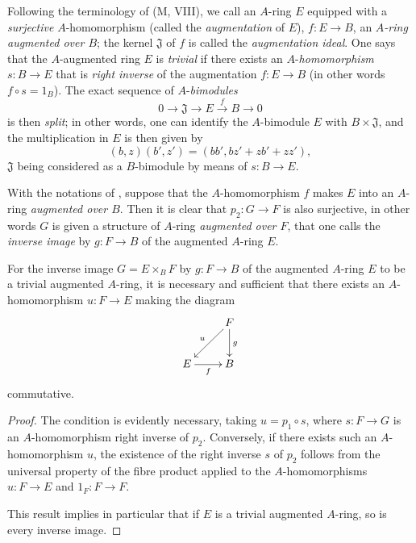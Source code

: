 \begin{env}[18.1.4]
\label{0.18.1.4}
Following the terminology of (M, VIII), we call an $A$-ring $E$ equipped with a \emph{surjective} $A$-homomorphism (called the \emph{augmentation} of $E$), $f:E\to B$, an \emph{$A$-ring augmented over $B$}; the kernel $\mathfrak{J}$ of $f$ is called the \emph{augmentation ideal}.
One says that the $A$-augmented ring $E$ is \emph{trivial} if there exists an $A$-\emph{homomorphism} $s:B\to E$ that is \emph{right inverse} of the augmentation $f:E\to B$ (in other words $f\circ s=1_B$).
The exact sequence of $A$-\emph{bimodules}
\[
  0\to\mathfrak{J}\to E\xrightarrow{f} B\to 0
\]
is then \emph{split}; in other words, one can identify the $A$-bimodule $E$ with $B\times\mathfrak{J}$, and the multiplication in $E$ is then given by
\[
  (b,z)(b',z')=(bb',bz'+zb'+zz'),
\]
$\mathfrak{J}$ being considered as a $B$-bimodule by means of $s:B\to E$.
\end{env}

\begin{env}[18.1.5]
\label{0.18.1.5}
With the notations of , suppose that the $A$-homomorphism $f$ makes $E$ into an $A$-ring \emph{augmented over $B$}.
Then it is clear that $p_2:G\to F$ is also surjective, in other words $G$ is given a structure of $A$-ring \emph{augmented over $F$}, that one calls the \emph{inverse image} by $g:F\to B$ of the augmented $A$-ring $E$.
\end{env}

\begin{proposition}[18.1.6]
\label{0.18.1.6}
For the inverse image $G=E\times_B F$ by $g:F\to B$ of the augmented $A$-ring $E$ to be a trivial augmented $A$-ring, it is necessary and sufficient that there exists an $A$-homomorphism $u:F\to E$ making the diagram
  \[
  \xymatrix{
    & F\ar[ld]_u\ar[d]^g\\
    E\ar[r]_f & B
  }
  \]
commutative.
\end{proposition}

\begin{proof}
The condition is evidently necessary, taking $u=p_1\circ s$, where $s:F\to G$ is an $A$-homomorphism right inverse of $p_2$.
Conversely, if there exists such an $A$-homomorphism $u$, the existence of the right inverse $s$ of $p_2$ follows from the universal property of the fibre product  applied to the $A$-homomorphisms $u:F\to E$ and $1_F:F\to F$.

This result implies in particular that if $E$ is a trivial augmented $A$-ring, so is every inverse image.
\end{proof}

